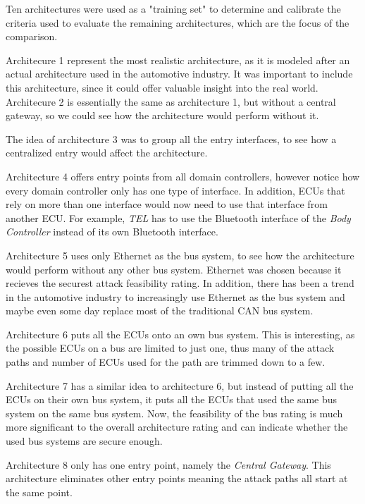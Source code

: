 Ten architectures were used as a "training set" to determine and calibrate the criteria used to evaluate the remaining architectures, which are the focus of the comparison.\\\par

Architecure 1 represent the most realistic architecture, as it is modeled after an actual architecture used in the automotive industry.
It was important to include this architecture, since it could offer valuable insight into the real world.
Architecure 2 is essentially the same as architecture 1, but without a central gateway, so we could see how the architecture would perform without it.\par
The idea of architecture 3 was to group all the entry interfaces, to see how a centralized entry would affect the architecture.\par
Architecture 4 offers entry points from all domain controllers, however notice how every domain controller only has one type of interface.
In addition, ECUs that rely on more than one interface would now need to use that interface from another ECU.
For example, \textit{TEL} has to use the Bluetooth interface of the \textit{Body Controller} instead of its own Bluetooth interface.\par
Architecture 5 uses only Ethernet as the bus system, to see how the architecture would perform without any other bus system.
Ethernet was chosen because it recieves the securest attack feasibility rating.
In addition, there has been a trend in the automotive industry to increasingly use Ethernet as the bus system and maybe even some day replace most of the traditional CAN bus system.\par
Architecture 6 puts all the ECUs onto an own bus system.
This is interesting, as the possible ECUs on a bus are limited to just one, thus many of the attack paths and number of ECUs used for the path are trimmed down to a few.\par
Architecture 7 has a similar idea to architecture 6, but instead of putting all the ECUs on their own bus system, it puts all the ECUs that used the same bus system on the same bus system.
Now, the feasibility of the bus rating is much more significant to the overall architecture rating and can indicate whether the used bus systems are secure enough.\par
Architecture 8 only has one entry point, namely the \textit{Central Gateway}. 
This architecture eliminates other entry points meaning the attack paths all start at the same point.
